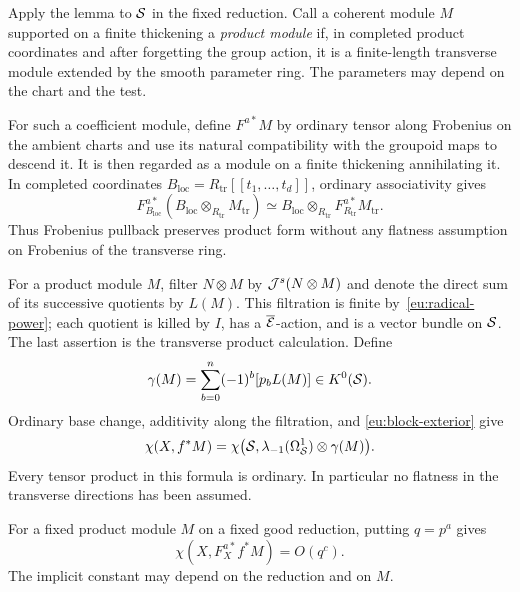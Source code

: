 Apply the lemma to $\mathcal S$ in the fixed reduction.  Call a coherent
module $M$ supported on a finite thickening a \emph{product module} if,
in completed product coordinates and after forgetting the group action,
it is a finite-length transverse module extended by the smooth parameter
ring.  The parameters may depend on the chart and the test.

For such a coefficient module, define $F^{a*}M$ by ordinary tensor
along Frobenius on the ambient charts and use its natural compatibility
with the groupoid maps to descend it.  It is then regarded as a module
on a finite thickening annihilating it.  In completed coordinates
$B_{\mathrm{loc}}=R_{\mathrm{tr}}[[t_1,\ldots,t_d]]$, ordinary
associativity gives
\[
 F_{B_{\mathrm{loc}}}^{a*}
   (B_{\mathrm{loc}}\otimes_{R_{\mathrm{tr}}}M_{\mathrm{tr}})
 \simeq
 B_{\mathrm{loc}}\otimes_{R_{\mathrm{tr}}}
       F_{R_{\mathrm{tr}}}^{a*}M_{\mathrm{tr}}.
\]
Thus Frobenius pullback preserves product form without any flatness
assumption on Frobenius of the transverse ring.

For a product module $M$, filter $N\otimes M$ by
$\mathcal J^s(N\otimes M)$ and denote the direct sum of its successive quotients
by $L(M)$.  This filtration is finite by~\eqref{eu:radical-power}; each
quotient is killed by $I$, has a $\overline{\mathcal E}$-action, and is a
vector bundle on $\mathcal S$.  The last assertion is the transverse product
calculation.  Define
\begin{equation}\label{eu:gamma}
 \gamma(M)=\sum_{b=0}^n(-1)^b[p_bL(M)]\in K^0(\mathcal S).
\end{equation}
Ordinary base change, additivity along the filtration, and
\eqref{eu:block-exterior} give
\begin{equation}\label{eu:euler-test}
 \chi(X,f^*M)=
 \chi\bigl(\mathcal S,\lambda_{-1}(\Omega^1_{\mathcal S})\otimes\gamma(M)\bigr).
\end{equation}
Every tensor product in this formula is ordinary.  In particular no
flatness in the transverse directions has been assumed.

\begin{lemma}\label{eu:growth}
For a fixed product module $M$ on a fixed good reduction, putting
$q=p^a$ gives
\[
              \chi(X,F_X^{a*}f^*M)=O(q^c).
\]
The implicit constant may depend on the reduction and on $M$.
\end{lemma}

